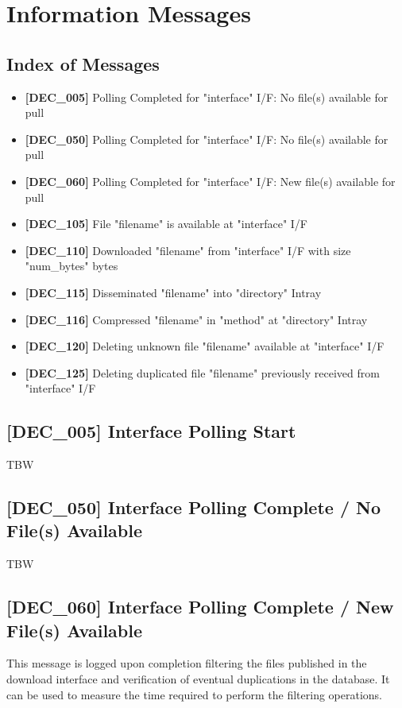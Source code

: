 \documentclass[dec_sum_main.tex]{subfiles}
\begin{document}

\section{Information Messages}

\subsection{Index of Messages}

\begin{itemize}
	\item \textbf{[DEC\_005]} Polling Completed for "interface" I/F: No file(s) available for pull	
	\item \textbf{[DEC\_050]} Polling Completed for "interface" I/F: No file(s) available for pull	
	\item \textbf{[DEC\_060]} Polling Completed for "interface" I/F: New file(s) available for pull
	\item \textbf{[DEC\_105]} File "filename" is available at "interface" I/F
	\item \textbf{[DEC\_110]} Downloaded "filename" from "interface" I/F with size "num\_bytes" bytes
	\item \textbf{[DEC\_115]} Disseminated "filename" into "directory" Intray
	\item \textbf{[DEC\_116]} Compressed "filename" in "method" at "directory" Intray
	\item \textbf{[DEC\_120]} Deleting unknown file "filename" available at "interface" I/F
	\item \textbf{[DEC\_125]} Deleting duplicated file "filename" previously received from "interface" I/F
\end{itemize}

\subsection{[DEC\_005] Interface Polling Start}
TBW

\subsection{[DEC\_050] Interface Polling Complete / No File(s) Available}
TBW

\subsection{[DEC\_060] Interface Polling Complete / New File(s) Available}
This message is logged upon completion filtering the files published in the download interface and verification of eventual duplications in the database. It can be used to measure the time required to perform the filtering operations. 
\end{document}
